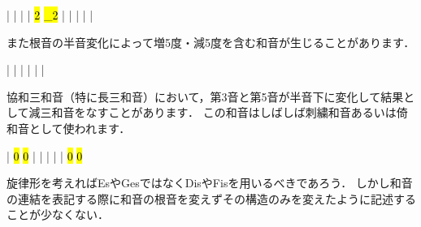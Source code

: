 \documentclass[dvipdfmx,uplatex,b5paper,openany,jbase=12Q,nomag*,textwidth-limit=44%
               ]{gachimuchi}[2020/05/05]
\begin{document}
\begin{Music}
  \generalmeter{\meterC}%
  \Startpiece
  \NOTes%
  |%
  \en\bar%
  \NOTEs%
  |%
  \en\doublebar%
  \NOTes%
  |%
  \hl{2}%
  \hl{_2}%
  \en\bar%
  \NOTEs%
  |%
  \en\doublebar%
  \NOTes%
  |%
  \en\bar%
  \NOTEs%
  |%
  \en\setdoublebar%
  \endpiece%
\end{Music}

また根音の半音変化によって増5度・減5度を含む和音が生じることがあります．

\begin{Music}
  \generalmeter{\meterC}%
  \Startpiece
  \NOTes%
  |%
  \sk%
  \en\bar%
  \NOTEs%
  |%
  \en\doublebar%
  \NOTes%
  |%
  \sk%
  \en\bar%
  \NOTEs%
  |%
  \en\setdoublebar%
  \endpiece%
\end{Music}

協和三和音（特に長三和音）において，第3音と第5音が半音下に変化して結果として減三和音をなすことがあります．
この和音はしばしば刺繍和音あるいは倚和音として使われます．

\begin{Music}
  \generalmeter{\meterC}%
  \Startpiece
  \NOTes%
  |%
  \hl{0}%
  \hl{0}%
  \en\bar%
  \NOTes%
  \Mryaku\sk|%
  \Mryaku\sk%
  \en\doublebar%
  \NOTes%
  \Mryaku\sk{}|%
  \Mryaku\sk{}%
  \en\bar%
  \NOTes%
  |%
  \hl{0}%
  \hl{0}%
  \en\setdoublebar%
  \endpiece%
\end{Music}

\begin{NB}
旋律形を考えればEsやGesではなくDisやFisを用いるべきであろう．
しかし和音の連結を表記する際に和音の根音を変えずその構造のみを変えたように記述することが少なくない．
\end{NB}
\end{document}
